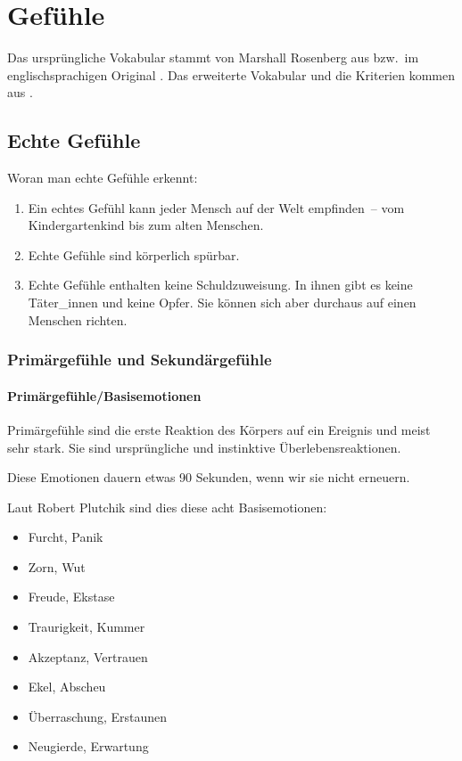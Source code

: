 \section{Gefühle}
\label{gefuehle}

Das ursprüngliche Vokabular stammt von Marshall Rosenberg aus \cite[S.~216]{gfk-rosenberg} bzw.~im englischsprachigen Original \cite[S.~210]{nvc-rosenberg}. Das erweiterte Vokabular und die Kriterien kommen aus \cite[S.~56~f]{gfk-dummies}.


\subsection{Echte Gefühle}

Woran man echte Gefühle erkennt:

\begin{enumerate}
 \item Ein echtes Gefühl kann jeder Mensch auf der Welt empfinden~-- vom Kindergartenkind bis zum alten Menschen.
 \item Echte Gefühle sind körperlich spürbar.
 \item Echte Gefühle enthalten keine Schuldzuweisung. In ihnen gibt es keine Täter\_innen und keine Opfer. Sie können sich aber durchaus auf einen Menschen richten.
\end{enumerate}

\subsubsection{Primärgefühle und Sekundärgefühle}

\paragraph{Primärgefühle/Basisemotionen}

Primärgefühle sind die erste Reaktion des Körpers auf ein Ereignis und meist sehr stark. Sie sind ursprüngliche und instinktive Überlebensreaktionen.

Diese Emotionen dauern etwas 90 Sekunden, wenn wir sie nicht \glqq erneuern\grqq.

Laut Robert Plutchik\cite{plutchik-emotions} sind dies diese acht Basisemotionen:

\begin{itemize}
  \item Furcht, Panik
  \item Zorn, Wut
  \item Freude, Ekstase
  \item Traurigkeit, Kummer
  \item Akzeptanz, Vertrauen
  \item Ekel, Abscheu
  \item Überraschung, Erstaunen
  \item Neugierde, Erwartung
\end{itemize}

